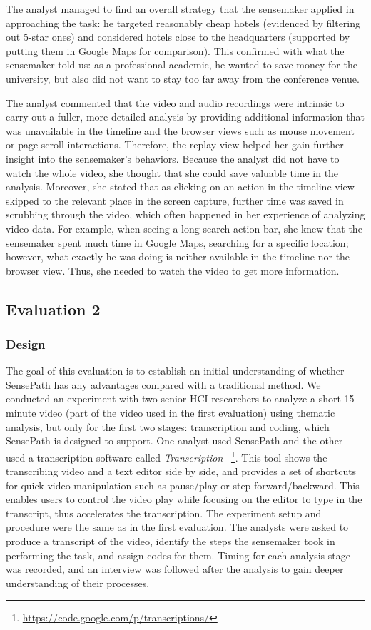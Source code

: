 The analyst managed to find an overall strategy that the sensemaker applied in approaching the task: he targeted reasonably cheap hotels (evidenced by filtering out 5-star ones) and considered hotels close to the headquarters (supported by putting them in Google Maps for comparison). This confirmed with what the sensemaker told us: as a professional academic, he wanted to save money for the university, but also did not want to stay too far away from the conference venue.

The analyst commented that the video and audio recordings were intrinsic to carry out a fuller, more detailed analysis by providing additional information that was unavailable in the timeline and the browser views such as mouse movement or page scroll interactions. Therefore, the replay view helped her gain further insight into the sensemaker's behaviors. Because the analyst did not have to watch the whole video, she thought that she could save valuable time in the analysis. Moreover, she stated that as clicking on an action in the timeline view skipped to the relevant place in the screen capture, further time was saved in scrubbing through the video, which often happened in her experience of analyzing video data. For example, when seeing a long search action bar, she knew that the sensemaker spent much time in Google Maps, searching for a specific location; however, what exactly he was doing is neither available in the timeline nor the browser view. Thus, she needed to watch the video to get more information.

\subsection{Evaluation 2}

\subsubsection{Design}
The goal of this evaluation is to establish an initial understanding of whether SensePath has any advantages compared with a traditional method. We conducted an experiment with two senior HCI researchers to analyze a short 15-minute video (part of the video used in the first evaluation) using thematic analysis, but only for the first two stages: transcription and coding, which SensePath is designed to support. One analyst used SensePath and the other used a transcription software called \textit{Transcription} ~\footnote{\url{https://code.google.com/p/transcriptions/}}. This tool shows the transcribing video and a text editor side by side, and provides a set of shortcuts for quick video manipulation such as pause/play or step forward/backward. This enables users to control the video play while focusing on the editor to type in the transcript, thus accelerates the transcription. The experiment setup and procedure were the same as in the first evaluation. The analysts were asked to produce a transcript of the video, identify the steps the sensemaker took in performing the task, and assign codes for them. Timing for each analysis stage was recorded, and an interview was followed after the analysis to gain deeper understanding of their processes.

